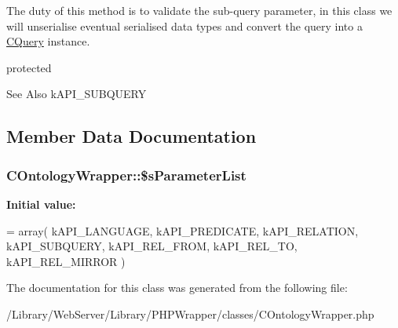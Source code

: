 The duty of this method is to validate the sub-\/query parameter, in this class we will unserialise eventual serialised data types and convert the query into a \hyperlink{class_c_query}{C\-Query} instance.

protected

\begin{DoxySeeAlso}{See Also}
k\-A\-P\-I\-\_\-\-S\-U\-B\-Q\-U\-E\-R\-Y 
\end{DoxySeeAlso}


\subsection{Member Data Documentation}
\hypertarget{class_c_ontology_wrapper_a5f4c3d1af99fc3147e40dd9adfd91f8a}{
\subsubsection[{\$s\-Parameter\-List}]{\setlength{\rightskip}{0pt plus 5cm}C\-Ontology\-Wrapper\-::\$s\-Parameter\-List\hspace{0.3cm}{\ttfamily [static]}}}\label{class_c_ontology_wrapper_a5f4c3d1af99fc3147e40dd9adfd91f8a}
{\bfseries Initial value\-:}
\begin{DoxyCode}
= array( kAPI\_LANGUAGE, kAPI\_PREDICATE,
                                                                         kAPI\_RELATION, kAPI\_SUBQUERY,
                                                                         kAPI\_REL\_FROM, kAPI\_REL\_TO, 
      kAPI\_REL\_MIRROR )
\end{DoxyCode}


The documentation for this class was generated from the following file\-:\begin{DoxyCompactItemize}
\item 
/\-Library/\-Web\-Server/\-Library/\-P\-H\-P\-Wrapper/classes/C\-Ontology\-Wrapper.\-php\end{DoxyCompactItemize}
